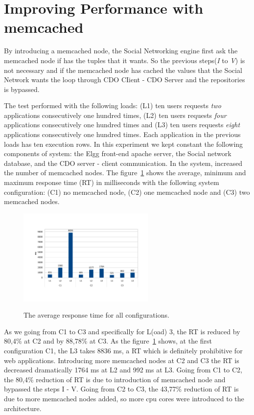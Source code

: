 \section{Improving Performance with memcached}
\label{sec:eval_memcache}
By introducing a memcached node, the Social Networking engine first ask the memcached node if has the tuples that it wants. So the previous steps(\emph{I} to \emph{V}) is not necessary and if the memcached node has cached the values that the Social Network wants the loop through CDO CIient - CDO Server and the repositories is bypassed. 

The test performed with the following loads: (L1) ten users requests \emph{two} applications consecutively one hundred times, (L2) ten users requests \emph{four} applications consecutively one hundred times and (L3) ten users requests \emph{eight} applications consecutively one hundred times. Each application in the previous loads has ten execution rows. In this experiment we kept constant the following components of system: the Elgg front-end apache server, the Social network database, and the CDO server - client communication. In the system, increased the number of memcached nodes.
The figure~\ref{fig:rtavg} shows the  average, minimum and maximum response time (RT) in milliseconds with the following system configuration: (C1) no memcached node, (C2) one memcached node and (C3) two memcached nodes.

\begin{figure}[h]
	\caption{The average response time for all configurations.}
	\includegraphics[width=0.6\textwidth,natwidth=200,natheight=150]{./fig/RTavg.pdf}
	\centering
	\label{fig:rtavg}
\end{figure}

As we going from C1 to C3 and specifically for L(oad) 3, the RT is reduced by 80,4\% at C2 and by 88,78\% at C3. As the figure~\ref{fig:rtavg} shows, at the first configuration C1, the L3 takes 8836 ms, a RT which is definitely prohibitive for web applications. Introducing more memcached nodes at C2 and C3 the RT is decreased dramatically 1764 ms at L2 and 992 ms at L3. Going from C1 to C2, the 80,4\% reduction of RT is due to introduction of memcached node and bypassed the steps I - V. Going from C2 to C3, the 43,77\% reduction of RT is due to more memcached nodes added, so more cpu cores were introduced to the architecture.

